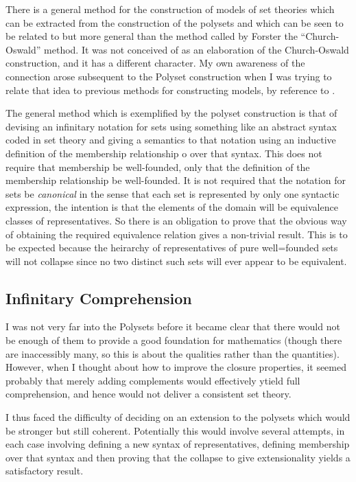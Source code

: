 \documentclass[numreferences]{rbjk}
\begin{document}
\begin{article}
There is a general method for the construction of models of set theories which can be extracted from the construction of the polysets and which can be seen to be related to but more general than the method called by Forster the ``Church-Oswald'' method.
It was not conceived of as an elaboration of the Church-Oswald construction, and it has a different character.
My own awareness of the connection arose subsequent to the Polyset construction when I was trying to relate that idea to previous methods for constructing models, by reference to \cite{forster92}.

The general method which is exemplified by the polyset construction is that of devising an infinitary notation for sets using something like an abstract syntax coded in set theory and giving a semantics to that notation using an inductive definition of the membership relationship o over that syntax.
This does not require that membership be well-founded, only that the definition of the membership relationship be well-founded.
It is not required that the notation for sets be \emph{canonical} in the sense that each set is represented by only one syntactic expression, the intention is that the elements of the domain will be equivalence classes of representatives.
So there is an obligation to prove that the obvious way of obtaining the required equivalence relation gives a non-trivial result.
This is to be expected because the heirarchy of representatives of pure well=founded sets will not collapse since no two distinct such sets will ever appear to be equivalent.

\subsection{Infinitary Comprehension}

I was not very far into the Polysets before it became clear that there would not be enough of them to provide a good foundation for mathematics (though there are inaccessibly many, so this is about the qualities rather than the quantities).
However, when I thought about how to improve the closure properties, it seemed probably that merely adding complements would effectively ytield full comprehension, and hence would not deliver a consistent set theory.

I thus faced the difficulty of deciding on an extension to the polysets which would be stronger but still coherent.
Potentially this would involve several attempts, in each case involving defining a new syntax of representatives, defining membership over that syntax and then proving that the collapse to give extensionality yields a satisfactory result.


\end{article}
\end{document}
